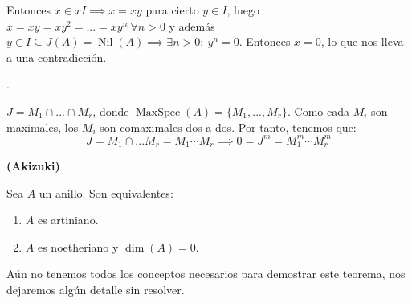 \documentclass[openany]{book}
\begin{document}
\begin{demonstration}
    Entonces $ x \in xI \implies x = xy $ para cierto $ y \in I $, luego $ x = xy = xy^2 = ... = xy^{n}\ \forall  n > 0$ y además $ y \in I \subseteq  J(A) = \operatorname{Nil}(A) \implies \exists n> 0:\ y^{n} = 0 $. Entonces $ x = 0 $, lo que nos lleva a una contradicción.

    .

    $ J = M_1 \cap ... \cap M_{r} $, donde $ \operatorname{MaxSpec}(A) = \{M_1,...,M_{r}\} $. Como cada $ M_i $ son maximales, los $ M_i $ son comaximales dos a dos. Por tanto, tenemos que:
    $$ J = M_1 \cap ... M_{r} = M_1 \cdots M_{r} \implies 0 = J^{m} = M_1^{m}\cdots M_{r}^{m} $$


\end{demonstration}

\begin{theorem}
    \textbf{(Akizuki)}

    Sea $ A $ un anillo. Son equivalentes:
    \begin{enumerate}
        \item $ A $ es artiniano.
        \item $ A $ es noetheriano y $ \operatorname{dim}(A) = 0 $.
    \end{enumerate}
\end{theorem}

Aún no tenemos todos los conceptos necesarios para demostrar este teorema, nos dejaremos algún detalle sin resolver.
\end{document}

